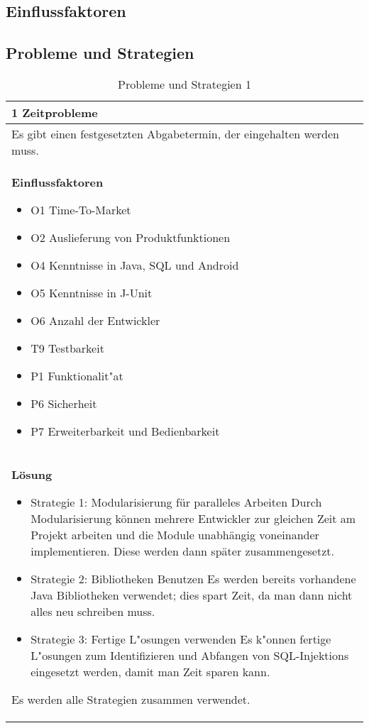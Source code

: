 \subsection{Einflussfaktoren}
\label{sec:einflussfaktoren}



\subsection{Probleme und Strategien}
\label{sec:strategien}
\begin{table}[H]
\caption{Probleme und Strategien 1}
\begin{tabular}{|p{\textwidth}|}\hline
1 Zeitprobleme\\ \hline
Es gibt einen festgesetzten Abgabetermin, der eingehalten werden muss.\\ \hline
\textbf{Einflussfaktoren}
\begin{itemize}
\item O1 Time-To-Market
\item O2 Auslieferung von Produktfunktionen
\item O4 Kenntnisse in Java, SQL  und Android
\item O5 Kenntnisse in J-Unit
\item O6 Anzahl der Entwickler
\item T9 Testbarkeit
\item P1 Funktionalit"at
\item P6 Sicherheit
\item P7 Erweiterbarkeit und Bedienbarkeit
\end{itemize}\\ \hline
\textbf{Lösung}
\begin{itemize}
\item Strategie 1: Modularisierung für paralleles Arbeiten \leavevmode\newline
Durch Modularisierung können mehrere Entwickler zur gleichen Zeit am Projekt arbeiten und die Module unabhängig voneinander implementieren. Diese werden dann später zusammengesetzt.
\item Strategie 2: Bibliotheken Benutzen \leavevmode\newline
Es werden bereits vorhandene Java Bibliotheken verwendet; dies spart Zeit, da man dann nicht alles neu schreiben muss.
\item Strategie 3: Fertige L"osungen verwenden \leavevmode\newline
Es k"onnen fertige L"osungen zum Identifizieren und Abfangen von SQL-Injektions eingesetzt werden, damit man Zeit sparen kann.
\end{itemize}
Es werden alle Strategien zusammen verwendet.\\ \hline
\end{tabular}
\end{table}

